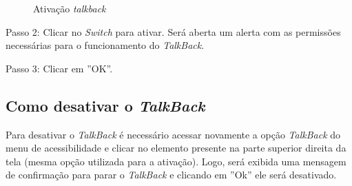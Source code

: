 \begin{figure}[H]
  \centering
  \caption{\label{talkback2}Ativação \textit{talkback}}
  \par{}
\end{figure}

Passo 2: Clicar no \textit{Switch} para ativar. Será aberta um alerta com as permissões necessárias para o funcionamento do \textit{TalkBack}.

Passo 3: Clicar em ''OK''.

\subsection{Como desativar o \textit{TalkBack}}

Para desativar o \textit{TalkBack} é necessário acessar novamente a opção \textit{TalkBack} do menu de acessibilidade e clicar no elemento presente na parte superior direita da tela (mesma opção utilizada para a ativação). Logo, será exibida uma mensagem de confirmação para parar o \textit{TalkBack} e clicando em ''Ok'' ele será desativado.

